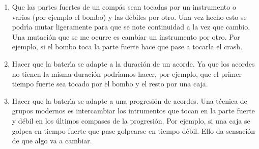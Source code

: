 \begin{enumerate}
\item Que las partes fuertes de un comp\'as sean tocadas por un instrumento o varios
(por ejemplo el bombo) y las d\'ebiles por otro. Una vez hecho esto se podr\'\i a
mutar ligeramente para que se note continuidad a la vez que cambio.\\ 
Una mutaci\'on que se me ocurre es cambiar un instrumento por otro. Por ejemplo, 
si el bombo toca la parte fuerte hace que pase a tocarla el crash.
\item Hacer que la bater\'\i a se adapte a la duraci\'on de un acorde. Ya que los
acordes no tienen la misma duraci\'on podr\'\i amos hacer, por ejemplo, que el primer
tiempo fuerte sea tocado por el bombo y el resto por una caja.
\item Hacer que la bater\'\i a se adapte a una progresi\'on de acordes. Una t\'ecnica 
de grupos modernos es intercambiar los intrumentos que tocan en la parte
fuerte y d\'ebil en los \'ultimos compases de la progresi\'on. Por ejemplo, 
si una caja se golpea en tiempo fuerte que 
pase golpearse en tiempo d\'ebil. Ello da sensaci\'on de que algo va a cambiar.
\end{enumerate}

